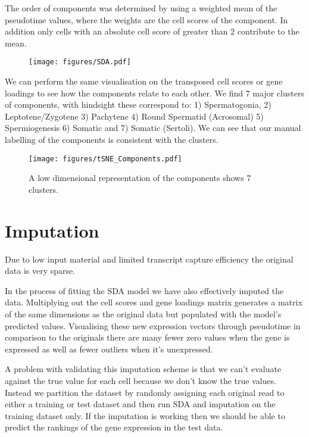 The order of components was determined by using a weighted mean of the pseudotime values, where the weights are the cell scores of the component. In addition only cells with an absolute cell score of greater than 2 contribute to the mean.

\begin{figure}[H]
	\centering
	\texttt{[image: figures/SDA.pdf]}
	\caption{}
	\label{fig:SDA}
\end{figure}

We can perform the same visualisation on the transposed cell scores or gene loadings to see how the components relate to each other. We find 7 major clusters of components, with hindsight these correspond to: 1) Spermatogonia, 2) Leptotene/Zygotene 3) Pachytene 4) Round Spermatid (Acrosomal) 5) Spermiogenesis 6) Somatic and 7) Somatic (Sertoli). We can see that our manual labelling of the components is consistent with the clusters.

\begin{figure}[H]
	\centering
	\texttt{[image: figures/tSNE\_Components.pdf]}
	\caption{A low dimensional representation of the components shows 7 clusters.}
	\label{fig:tSNE_Components}
\end{figure}



\section{Imputation}

Due to low input material and limited transcript capture efficiency the original data is very sparse. 

In the process of fitting the SDA model we have also effectively imputed the data. Multiplying out the cell scores and gene loadings matrix generates a matrix of the same dimensions as the original data but populated with the model's predicted values. Visualising these new expression vectors through pseudotime in comparison to the originals there are many fewer zero values when the gene is expressed as well as fewer outliers when it's unexpressed.

A problem with validating this imputation scheme is that we can't evaluate against the true value for each cell because we don't know the true values. Instead we partition the dataset by randomly assigning each original read to either a training or test dataset and then run SDA and imputation on the training dataset only. If the imputation is working then we should be able to predict the rankings of the gene expression in the test data.



